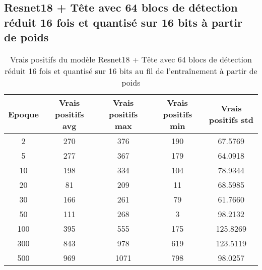 
\clearpage
\subsection{Resnet18 + Tête avec 64 blocs de détection réduit 16 fois et quantisé sur 16 bits à partir de poids}

\begin{table}[!ht]
    \caption{Vrais positifs du modèle Resnet18 + Tête avec 64 blocs de détection réduit 16 fois et quantisé sur 16 bits au fil de l'entraînement à partir de poids}
    \label{tab:qresnet18+head_64n_reduced_16x_true_positive_16b_from_weights}
    \centering
    \begin{tabular}{ |c||c|c|c|c|  }
        \hline
        \rowcolor{gray!50}
        Epoque & Vrais positifs avg & Vrais positifs max & Vrais positifs min & Vrais positifs std\\
        \hline
        2 & 270 & 376 & 190 & 67.5769\\
        5 & 277 & 367 & 179 & 64.0918\\
        10 & 198 & 334 & 104 & 78.9344\\
        20 & 81 & 209 & 11 & 68.5985\\
        30 & 166 & 261 & 79 & 61.7660\\
        50 & 111 & 268 & 3 & 98.2132\\
        100 & 395 & 555 & 175 & 125.8269\\
        300 & 843 & 978 & 619 & 123.5119\\
        500 & 969 & 1071 & 798 & 98.0257\\
        \hline
    \end{tabular}
\end{table}

